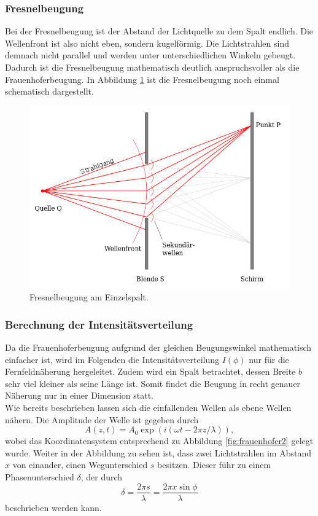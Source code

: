 \subsubsection*{Fresnelbeugung}
Bei der Fresnelbeugung ist der Abstand der Lichtquelle zu dem Spalt endlich. Die Wellenfront ist also nicht eben, sondern kugelförmig. Die Lichtstrahlen sind
demnach nicht parallel und werden unter unterschiedlichen Winkeln gebeugt. Dadurch ist die Fresnelbeugung mathematisch deutlich anspruchsvoller als die
Frauenhoferbeugung. In Abbildung \ref{fig:fresnel} ist die Fresnelbeugung noch einmal schematisch dargestellt.
\begin{figure}[H]
    \centering
    \includegraphics[scale = 0.45]{pictures/fresnel.png}
    \caption{Fresnelbeugung am Einzelspalt. \cite{AP02}}
    \label{fig:fresnel}
\end{figure}
\noindent

\subsubsection*{Berechnung der Intensitätsverteilung}
\label{sec:intensität}
Da die Frauenhoferbeugung aufgrund der gleichen Beugungswinkel mathematisch einfacher ist, wird im Folgenden die Intensitätsverteilung $I(\phi)$
nur für die Fernfeldnäherung hergeleitet. Zudem wird ein Spalt betrachtet, dessen Breite $b$ sehr viel kleiner als seine Länge ist. Somit findet
die Beugung in recht genauer Näherung nur in einer Dimension statt.
\\\noindent
Wie bereits beschrieben lassen sich die einfallenden Wellen als ebene Wellen nähern. Die Amplitude der Welle ist gegeben durch
\begin{equation*}
    A(z,t)=A_0\exp{(i(\omega t-2\pi z/\lambda))}    ,
    \label{eqn:ebenewelle}
\end{equation*}
wobei das Koordinatensystem entsprechend zu Abbildung \ref{fig:frauenhofer2} gelegt wurde. Weiter in der Abbildung zu sehen ist, dass zwei
Lichtstrahlen im Abstand $x$ von einander, einen Wegunterschied $s$ besitzen. Dieser führ zu einem Phasenunterschied $\delta$, der durch
\begin{equation*}
    \delta=\frac{2\pi s}{\lambda}=\frac{2\pi x \sin{\phi}}{\lambda}
    \label{eqn:phase}
\end{equation*}
beschrieben werden kann.

